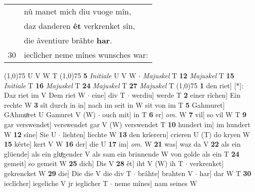 \documentclass[8pt,a4paper,notitlepage]{article}
\begin{document}
\begin{table}[ht]
\begin{minipage}[t]{0.5\linewidth}
\begin{tabular}{rl}
 & nû manet mich diu vuoge mîn,\\ 
 & daz danderen \textbf{êt} verkrenket sîn,\\ 
 & die âventiure brâhte \textbf{har}.\\ 
30 & ieclîcher neme mînes wunsches war:\\ 
\end{tabular}
\scriptsize
\line(1,0){75} \newline
U V W T \newline
\line(1,0){75} \newline
\textbf{5} \textit{Initiale} U V W   $\cdot$ \textit{Majuskel} T  \textbf{12} \textit{Majuskel} T  \textbf{15} \textit{Initiale} T  \textbf{16} \textit{Majuskel} T  \textbf{24} \textit{Majuskel} T  \textbf{27} \textit{Majuskel} T  \newline
\line(1,0){75} \newline
\textbf{1} den riet] [*]: Daz riet im V Dem riet W  $\cdot$ eine] div T  $\cdot$ werdiu] werde T \textbf{2} einer rîchen] Ein rechte W \textbf{3} sît durch in in] nach im seit in W sit von im T \textbf{5} Gahmuret] GAhmuͦret U Gamuret V (W)  $\cdot$ ouch mit] in T \textbf{6} er] \textit{om.} W \textbf{7} vil] so vil W T \textbf{9} gar verswendet] verswendet gar V (W) verswendet T \textbf{10} hundert im] im hundert W \textbf{12} sîne] Sie U  $\cdot$ liehten] liechte W \textbf{13} den krîerern] crieren U (T) do kryen W \textbf{15} kêrte] kert V W \textbf{16} der] die U \textbf{17} im] \textit{om.} W \textbf{21} was] waz da V \textbf{22} als ein glüende] als ein gluͤgender V als sam ein brinnende W von golde als ein T \textbf{24} gemeit] so gemeit W \textbf{25} dich] Dis V \textbf{28} êt] iht V (W) ih T  $\cdot$ verkrenket] gekrencket W \textbf{29} die] Die die V die div T  $\cdot$ brâhte] brahten V  $\cdot$ har] dar W T \textbf{30} ieclîcher] iegeliche V jr ieglicher T  $\cdot$ neme mînes] nam seines W \newline
\end{minipage}
\end{table}
\end{document}
